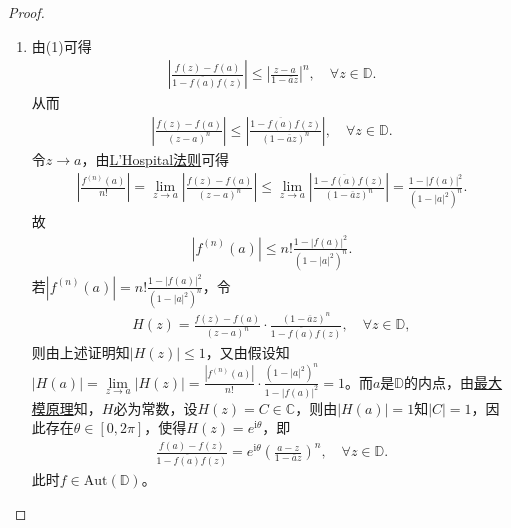 \documentclass[../../main.tex]{subfiles}%
\begin{document}
\begin{proof}
\begin{enumerate}[(1)]
\begin{align*}
g(z)&=z^n h(z)=e^{\mathrm{i}\theta}z^n\Longleftrightarrow \psi\circ f\circ \varphi(z)=e^{\mathrm{i}\theta}z^n\\
&\Longleftrightarrow \psi\circ f(z)=e^{\mathrm{i}\theta}\left(\varphi^{-1}(z)\right)^n=e^{\mathrm{i}\theta}\varphi^n(z)\\
&\Longleftrightarrow \frac{f(a)-f(z)}{1-\overline{f(a)}f(z)}=e^{\mathrm{i}\theta}\left(\frac{a-z}{1-\overline{a}z}\right)^n.
\end{align*}
此时$f\in\mathrm{Aut}(\mathbb{D})$。

\item  由(1)可得
\begin{align*}
\left|\frac{f(z)-f(a)}{1-\overline{f(a)}f(z)}\right|\leqslant \left|\frac{z-a}{1-\overline{a}z}\right|^n,\quad \forall z\in\mathbb{D}.
\end{align*}
从而
\begin{align*}
\left|\frac{f(z)-f(a)}{(z-a)^n}\right|\leqslant \left|\frac{1-\overline{f(a)}f(z)}{(1-\overline{a}z)^n}\right|,\quad \forall z\in\mathbb{D}.
\end{align*}
令$z\rightarrow a$，由\hyperref[theorem:解析函数一般形式的L'Hospital法则]{L'Hospital法则}可得
\begin{align*}
\left|\frac{f^{(n)}(a)}{n!}\right|=\lim\limits_{z\rightarrow a}\left|\frac{f(z)-f(a)}{(z-a)^n}\right|\leqslant\lim\limits_{z\rightarrow a}\left|\frac{1-\overline{f(a)}f(z)}{(1-\overline{a}z)^n}\right|=\frac{1-|f(a)|^2}{(1-|a|^2)^n}.
\end{align*}
故
\begin{align*}
|f^{(n)}(a)|\leqslant n!\frac{1-|f(a)|^2}{(1-|a|^2)^n}.
\end{align*}
若$|f^{(n)}(a)|=n!\frac{1-|f(a)|^2}{(1-|a|^2)^n}$，令
\begin{align*}
H(z)=\frac{f(z)-f(a)}{(z-a)^n}\cdot\frac{(1-\overline{a}z)^n}{1-\overline{f(a)}f(z)},\quad \forall z\in\mathbb{D},
\end{align*}
则由上述证明知$|H(z)|\leqslant 1$，又由假设知$|H(a)|=\lim\limits_{z\rightarrow a}|H(z)|=\frac{|f^{(n)}(a)|}{n!}\cdot\frac{(1-|a|^2)^n}{1-|f(a)|^2}=1$。而$a$是$\mathbb{D}$的内点，由\hyperref[theorem:最大模原理-定理4.5.1]{最大模原理}知，$H$必为常数，设$H(z)=C\in\mathbb{C}$，则由$|H(a)|=1$知$|C|=1$，因此存在$\theta\in[0,2\pi]$，使得$H(z)=e^{\mathrm{i}\theta}$，即
\begin{align*}
\frac{f(a)-f(z)}{1-\overline{f(a)}f(z)}=e^{\mathrm{i}\theta}\left(\frac{a-z}{1-\overline{a}z}\right)^n,\quad \forall z\in\mathbb{D}.
\end{align*}
此时$f\in\mathrm{Aut}(\mathbb{D})$。
\end{enumerate}

\end{proof}
\end{document}
